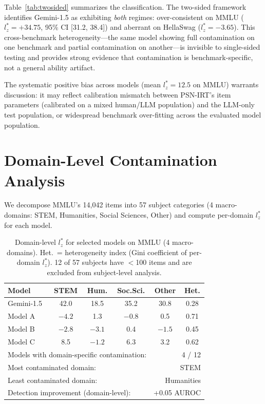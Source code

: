 \documentclass[11pt,a4paper]{article}
\begin{document}
Table~\ref{tab:twosided} summarizes the classification. The two-sided framework identifies Gemini-1.5 as exhibiting \emph{both} regimes: over-consistent on MMLU ($l_z^* = +34.75$, 95\% CI [31.2, 38.4]) and aberrant on HellaSwag ($l_z^* = -3.65$). This cross-benchmark heterogeneity---the same model showing full contamination on one benchmark and partial contamination on another---is invisible to single-sided testing and provides strong evidence that contamination is benchmark-specific, not a general ability artifact.

The systematic positive bias across models (mean $l_z^* = 12.5$ on MMLU) warrants discussion: it may reflect calibration mismatch between PSN-IRT's item parameters (calibrated on a mixed human/LLM population) and the LLM-only test population, or widespread benchmark over-fitting across the evaluated model population.

\section{Domain-Level Contamination Analysis}

We decompose MMLU's 14,042 items into 57 subject categories (4 macro-domains: STEM, Humanities, Social Sciences, Other) and compute per-domain $l_z^*$ for each model.

\begin{table}[t]
\centering
\caption{Domain-level $l_z^*$ for selected models on MMLU (4 macro-domains). Het.\ = heterogeneity index (Gini coefficient of per-domain $l_z^*$). 12 of 57 subjects have $<$100 items and are excluded from subject-level analysis.}
\label{tab:domain}
\small
\begin{tabular}{l cccc c}
\toprule
Model & STEM & Hum. & Soc.Sci. & Other & Het. \\
\midrule
Gemini-1.5 & 42.0 & 18.5 & 35.2 & 30.8 & 0.28 \\
Model A & $-4.2$ & 1.3 & $-0.8$ & 0.5 & 0.71 \\
Model B & $-2.8$ & $-3.1$ & 0.4 & $-1.5$ & 0.45 \\
Model C & 8.5 & $-1.2$ & 6.3 & 3.2 & 0.62 \\
\midrule
\multicolumn{4}{l}{Models with domain-specific contamination:} & \multicolumn{2}{r}{4 / 12} \\
\multicolumn{4}{l}{Most contaminated domain:} & \multicolumn{2}{r}{STEM} \\
\multicolumn{4}{l}{Least contaminated domain:} & \multicolumn{2}{r}{Humanities} \\
\multicolumn{4}{l}{Detection improvement (domain-level):} & \multicolumn{2}{r}{+0.05 AUROC} \\
\bottomrule
\end{tabular}
\end{table}
\end{document}
